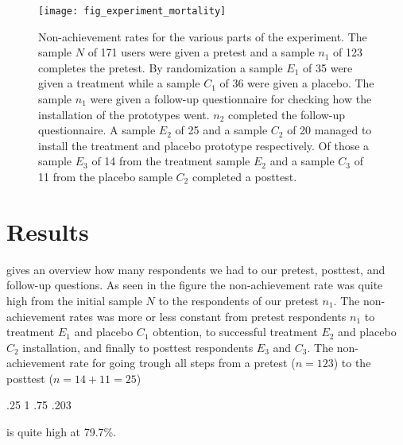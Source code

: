 \begin{figure}
  \begin{whole}
  \texttt{[image: fig\_experiment\_mortality]}
  \caption[Experiment Non-Achievement Rates]{
    Non-achievement rates for the various parts of the experiment.
    The sample $N$ of 171 \urort{} users were given a pretest and
    a sample $n_1$ of 123 completes the pretest.
    By randomization a sample $E_1$ of 35 were given a treatment while
    a sample $C_1$ of 36 were given a placebo.
    The sample $n_1$ were given a follow-up questionnaire for checking
    how the installation of the prototypes went. $n_2$ completed the follow-up
    questionnaire.
    A sample $E_2$ of 25 and a sample $C_2$ of 20 managed to install
    the treatment and placebo prototype respectively.
    Of those a sample $E_3$ of 14 from the treatment sample $E_2$ and
    a sample $C_3$ of 11 from the placebo sample $C_2$ completed
    a posttest.
  }
  \label{figure:fig.experiment.mortality}
  \end{whole}
\end{figure}

\section{Results}

 gives an overview how many respondents we
had to our pretest, posttest, and follow-up questions. As seen in the figure
the non-achievement rate was quite high from the initial sample $N$ to
the respondents of our pretest $n_1$. The non-achievement
rates was more or less constant from pretest respondents $n_1$ to treatment
$E_1$ and placebo $C_1$ obtention, to successful treatment $E_2$ and placebo
$C_2$ installation, and finally to posttest respondents $E_3$ and $C_3$.
The non-achievement rate for going trough
all steps from a pretest ($n = 123$) to the posttest ($n = 14 + 11 = 25$)
\begin{sparkline}{3}
  \sparkspike .25  1
  \sparkspike .75  .203
\end{sparkline}
is quite high at 79.7\%.

